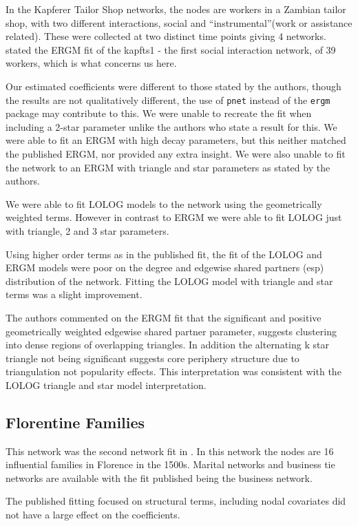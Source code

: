 \documentclass[
]{statsoc}
\begin{document}
In the Kapferer Tailor Shop networks, the nodes are workers in a Zambian
tailor shop, with two different interactions, social and
``instrumental''(work or assistance related). These were collected at
two distinct time points giving 4 networks. \cite{Robins2007} stated the
ERGM fit of the kapfts1 - the first social interaction network, of 39
workers, which is what concerns us here.

Our estimated coefficients were different to those stated by the
authors, though the results are not qualitatively different, the use of
\texttt{pnet} instead of the \texttt{ergm} package may contribute to
this. We were unable to recreate the fit when including a 2-star
parameter unlike the authors who state a result for this. We were able
to fit an ERGM with high decay parameters, but this neither matched the
published ERGM, nor provided any extra insight. We were also unable to
fit the network to an ERGM with triangle and star parameters as stated
by the authors.

We were able to fit LOLOG models to the network using the geometrically
weighted terms. However in contrast to ERGM we were able to fit LOLOG
just with triangle, 2 and 3 star parameters.

Using higher order terms as in the published fit, the fit of the LOLOG
and ERGM models were poor on the degree and edgewise shared partners
(esp) distribution of the network. Fitting the LOLOG model with triangle
and star terms was a slight improvement.

The authors commented on the ERGM fit that the significant and positive
geometrically weighted edgewise shared partner parameter, suggests
clustering into dense regions of overlapping triangles. In addition the
alternating k star triangle not being significant suggests core
periphery structure due to triangulation not popularity effects. This
interpretation was consistent with the LOLOG triangle and star model
interpretation.

\subsection{Florentine Families}

This network was the second network fit in \cite{Robins2007}. In this
network the nodes are 16 influential families in Florence in the 1500s.
Marital networks and business tie networks are available with the fit
published being the business network.

The published fitting focused on structural terms, including nodal
covariates did not have a large effect on the coefficients.
\end{document}
